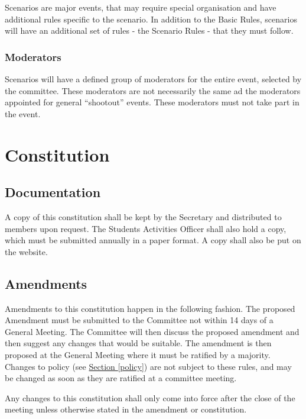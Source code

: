 \documentclass{report}
\newcommand{\sref}[1]{\hyperref[#1]{Section \ref*{#1}}}
\begin{document}
Scenarios are major events, that may require special organisation and have additional rules specific to the scenario. In addition to the Basic Rules, scenarios will have an additional set of rules - the Scenario Rules - that they must follow.

	\subsection*{Moderators}
	
	Scenarios will have a defined group of moderators for the entire event, selected by the committee. These moderators are not necessarily the same ad the moderators appointed for general ``shootout'' events. These moderators must not take part in the event.

\chapter{Constitution}

\section{Documentation}

A copy of this constitution shall be kept by the Secretary and distributed to members upon request. The Students Activities Officer shall also hold a copy, which must be submitted annually in a paper format. A copy shall also be put on the website.

\section{Amendments}

Amendments to this constitution happen in the following fashion. The proposed Amendment must be submitted to the Committee not within 14 days of a General Meeting. The Committee will then discuss the proposed amendment and then suggest any changes that would be suitable. The amendment is then proposed at the General Meeting where it must be ratified by a majority. Changes to policy (see \sref{policy}) are not subject to these rules, and may be changed as soon as they are ratified at a committee meeting.

Any changes to this constitution shall only come into force after the close of the meeting unless otherwise stated in the amendment or constitution.
\end{document}
